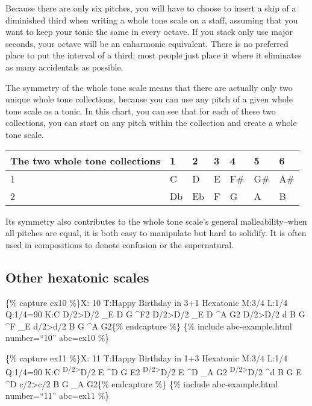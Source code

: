 \documentclass{book}
\begin{document}
Because there are only six pitches, you will have to choose to insert a skip
of a diminished third when writing a whole tone scale on a staff, assuming
that you want to keep your tonic the same in every octave. If you stack only
use major seconds, your octave will be an enharmonic equivalent. There is no
preferred place to put the interval of a third; most people just place it
where it eliminates as many accidentals as possible.

The symmetry of the whole tone scale means that there are actually only two
unique whole tone collections, because you can use any pitch of a given whole
tone scale as a tonic. In this chart, you can see that for each of these two
collections, you can start on any pitch within the collection and create a
whole tone scale.

\begin{longtable}[]{@{}lllllll@{}}
\toprule
The two whole tone collections & 1 & 2 & 3 & 4 & 5 & 6 \\
\midrule
\endhead
1 & C & D & E & F\# & G\# & A\# \\
2 & Db & Eb & F & G & A & B \\
\bottomrule
\end{longtable}

Its symmetry also contributes to the whole tone scale's general
malleability--when all pitches are equal, it is both easy to manipulate but
hard to solidify. It is often used in compositions to denote confusion or the
supernatural.

\hypertarget{other-hexatonic-scales}{%
\subsection{Other hexatonic scales}\label{other-hexatonic-scales}}

\{\% capture ex10 \%\}X: 10 T:Happy Birthday in 3+1 Hexatonic M:3/4 L:1/4
Q:1/4=90 K:C D/2\textgreater D/2\textbar{} \_E D G\textbar{} \^{}F2
D/2\textgreater D/2\textbar{} \_E D \^{}A\textbar{} G2
D/2\textgreater D/2\textbar{} d B G\textbar{} \^{}F \_E
d/2\textgreater d/2\textbar{} B G \^{}A\textbar{} G2\textbar{]}\{\% endcapture
\%\} \{\% include abc-example.html number=``10'' abc=ex10 \%\}

\{\% capture ex11 \%\}X: 11 T:Happy Birthday in 1+3 Hexatonic M:3/4 L:1/4
Q:1/4=90 K:C \textsuperscript{D/2\textgreater{}}D/2\textbar{} E \^{}D
G\textbar{} E2 \textsuperscript{D/2\textgreater{}}D/2\textbar{} E \^{}D
\_A\textbar{} G2 \textsuperscript{D/2\textgreater{}}D/2\textbar{} \^{}d B
G\textbar{} E \^{}D c/2\textgreater c/2\textbar{} B G \_A\textbar{}
G2\textbar{]}\{\% endcapture \%\} \{\% include abc-example.html number=``11''
abc=ex11 \%\}
\end{document}
